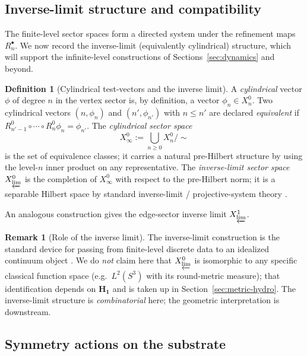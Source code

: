 \documentclass[11pt, a4paper]{amsart}
\theoremstyle{definition}
\newtheorem{definition}[theorem]{Definition}
\newtheorem{remark}[theorem]{Remark}
\begin{document}
\subsection{Inverse-limit structure and compatibility}
\label{subsec:inverse-limit}

The finite-level sector spaces form a directed system under the
refinement maps $R_n^\bullet$. We now record the inverse-limit
(equivalently cylindrical) structure, which will support the
infinite-level constructions of Sections~\ref{sec:dynamics}
and beyond.

\begin{definition}[Cylindrical test-vectors and the inverse limit]
\label{def:inverse-limit}
A \emph{cylindrical} vector $\phi$ of degree $n$ in the vertex
sector is, by definition, a vector $\phi_n \in X_n^0$. Two
cylindrical vectors $(n, \phi_n)$ and $(n', \phi_{n'})$ with
$n \leq n'$ are declared \emph{equivalent} if
$R_{n'-1}^0 \circ \cdots \circ R_n^0 \phi_n = \phi_{n'}$. The
\emph{cylindrical sector space}
\[
  X^0_\infty := \bigcup_{n \geq 0} X_n^0 / \sim
\]
is the set of equivalence classes; it carries a natural pre-Hilbert
structure by using the level-$n$ inner product on any
representative. The \emph{inverse-limit sector space}
$X^0_{\varprojlim}$ is the completion of $X^0_\infty$ with respect
to the pre-Hilbert norm; it is a separable Hilbert space by
standard inverse-limit / projective-system theory
\cite[\S 6.2]{ReedSimonI}.

An analogous construction gives the edge-sector inverse limit
$X^1_{\varprojlim}$.
\end{definition}

\begin{remark}[Role of the inverse limit]
The inverse-limit construction is the standard device for
passing from finite-level discrete data to an idealized continuum
object \cite{ReedSimonI}. We do \emph{not} claim here that
$X^0_{\varprojlim}$ is isomorphic to any specific classical
function space (e.g.\ $L^2(S^3)$ with its round-metric measure); that
identification depends on $\mathbf{H_1}$ and is taken up in
Section~\ref{sec:metric-hydro}. The inverse-limit structure is
\emph{combinatorial} here; the geometric interpretation is
downstream.
\end{remark}

\subsection{Symmetry actions on the substrate}
\label{subsec:symmetries}
\end{document}

